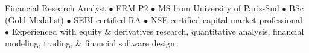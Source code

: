 %
%
%
\par{
Financial Research Analyst $\bullet$ FRM P2 $\bullet$ MS from University of Paris-Sud $\bullet$ BSc (Gold Medalist) $\bullet$ SEBI certified RA $\bullet$ NSE certified capital market professional $\bullet$ Experienced with equity \& derivatives research, quantitative analysis, financial modeling, trading, \& financial software design.



}